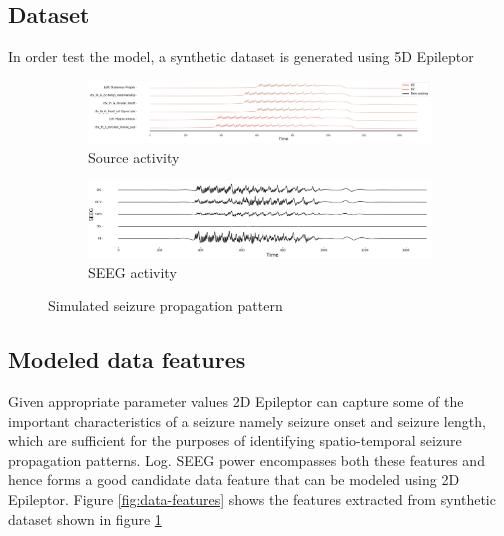 \documentclass[12pt]{article}
\begin{document}
\subsection*{Dataset}
In order test the model, a synthetic dataset is generated using 5D Epileptor
\begin{figure}[h!]
  \centering
  \begin{subfigure}{\linewidth}
    \includegraphics[width=\textwidth]{figures/source_activity_syn_data.png}
    \caption{Source activity}
  \end{subfigure}
  \begin{subfigure}{\linewidth}
    \includegraphics[width=\textwidth]{figures/seeg_syn_data.png}
    \caption{SEEG activity}
  \end{subfigure}
  \caption{Simulated seizure propagation pattern}
  \label{fig:syn-data}
\end{figure}
\subsection*{Modeled data features}
Given appropriate parameter values 2D Epileptor can capture some of the important characteristics of a seizure namely seizure onset and seizure length, which are sufficient for the purposes of identifying spatio-temporal seizure propagation patterns. Log. SEEG power encompasses both these features and hence forms a good candidate data feature that can be modeled using 2D Epileptor. Figure \ref{fig:data-features} shows the features extracted from synthetic dataset shown in figure \ref{fig:syn-data}
\end{document}
